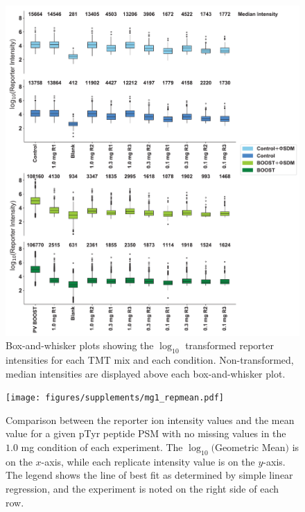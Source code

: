 \documentclass[journal=jprobs,manuscript=article]{achemso}
\begin{document}
\begin{figure}
\centering
\includegraphics[width=150mm]{figures/supplements/intensity_plots.pdf}
\caption{Box-and-whisker plots showing the $\log_{10}$ transformed reporter intensities for each TMT mix and each condition. Non-transformed, median intensities are displayed above each box-and-whisker plot.}\label{intensity_plots}
\end{figure}

\clearpage

\begin{figure}
\centering
\texttt{[image: figures/supplements/mg1\_repmean.pdf]}
\caption{Comparison between the reporter ion intensity values and the mean value  for a given pTyr peptide PSM with no missing values in the $1.0$ mg condition of each experiment. The $\log_{10}($Geometric Mean$)$ is on the $x$-axis, while each replicate intensity value is on the $y$-axis. The legend shows the line of best fit as determined by simple linear regression\cite{grus2019data}, and the experiment is noted on the right side of each row.  }\label{mg1_repmean}
\end{figure}

\clearpage
\end{document}
